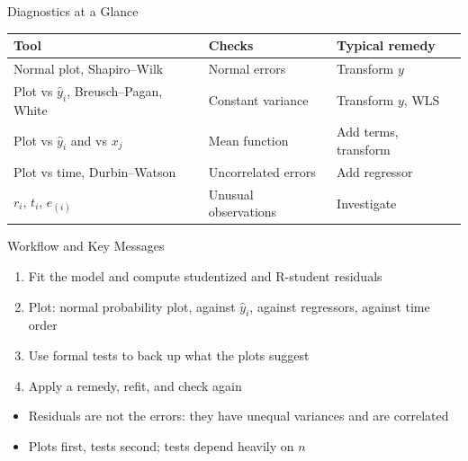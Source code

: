 \begin{frame}{Diagnostics at a Glance}
    \begin{center}
        \begin{tabular}{lll}
            \toprule
            Tool & Checks & Typical remedy \\
            \midrule
            Normal plot, Shapiro--Wilk & Normal errors & Transform $y$ \\
            Plot vs $\hat y_i$, Breusch--Pagan, White & Constant variance & Transform $y$, WLS \\
            Plot vs $\hat y_i$ and vs $x_j$ & Mean function & Add terms, transform \\
            Plot vs time, Durbin--Watson & Uncorrelated errors & Add regressor \\
            $r_i$, $t_i$, $e_{(i)}$ & Unusual observations & Investigate \\
            \bottomrule
        \end{tabular}
    \end{center}
\end{frame}


\begin{frame}{Workflow and Key Messages}
    \begin{enumerate}
        \item Fit the model and compute studentized and R-student residuals
        \item Plot: normal probability plot, against $\hat y_i$, against regressors, against time order
        \item Use formal tests to back up what the plots suggest
        \item Apply a remedy, refit, and check again
    \end{enumerate}
    \begin{itemize}
        \item Residuals are not the errors: they have unequal variances and are correlated
        \item Plots first, tests second; tests depend heavily on $n$
    \end{itemize}
\end{frame}